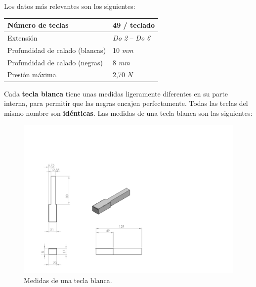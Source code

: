 
Los datos más relevantes son los siguientes:

\smallskip

\begin{center}
	\begin{tabular}{|l|l|}
		\hline Número de teclas & 49 / teclado \\
		\hline Extensión & \textit{Do 2} -- \textit{Do 6} \\
		\hline Profundidad de calado (blancas) & 10 \textit{mm} \\
		\hline Profundidad de calado (negras) & 8 \textit{mm} \\
		\hline Presión máxima & 2,70 \textit{N} \\
		\hline
	\end{tabular}
	\smallskip
\end{center}

\smallskip

Cada \textbf{tecla blanca} tiene unas medidas ligeramente diferentes en su parte interna, para permitir que las negras encajen perfectamente. Todas las teclas del mismo nombre son \textbf{idénticas}. Las medidas de una tecla blanca son las siguientes:

\smallskip

\begin{figure}[H]
	\noindent \begin{centering}
		\includegraphics[clip=true,trim=0 0 360 150, width=\linewidth/2]{capitulo3/blanca_modelo}
		\par\end{centering}
	\smallskip
	\caption{\label{fig:blanca_modelo} Medidas de una tecla blanca.}
\end{figure} 

